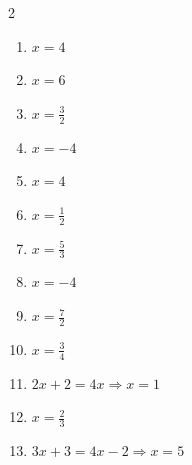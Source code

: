 \documentclass[11pt]{article}
\begin{document}
\begin{keybox}
\begin{multicols}{2}
\small
\begin{enumerate}[leftmargin=*,itemsep=3pt]
  \item $x=4$
  \item $x=6$
  \item $x=\tfrac32$
  \item $x=-4$
  \item $x=4$
  \item $x=\tfrac12$
  \item $x=\tfrac53$
  \item $x=-4$
  \item $x=\tfrac72$
  \item $x=\tfrac34$
  \item $2x+2=4x\Rightarrow x=1$
  \item $x=\tfrac23$
  \item $3x+3=4x-2\Rightarrow x=5$
\end{enumerate}
\end{multicols}
\end{keybox}
\end{document}
